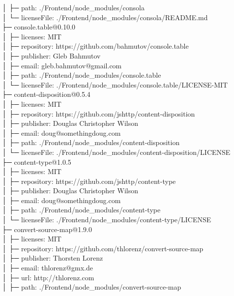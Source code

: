 \documentclass[
    paper=a4,
    twoside=false,
    parskip=half,
    listof=entryprefix,
    listof=totoc,
    index=totoc,
    bibliography=totoc,
    headsepline,
]{scrbook}
\begin{document}
    │  ├─ path: ./Frontend/node\_modules/consola\\
    │  └─ licenseFile: ./Frontend/node\_modules/consola/README.md\\
    ├─ console.table@0.10.0\\
    │  ├─ licenses: MIT\\
    │  ├─ repository: https://github.com/bahmutov/console.table\\
    │  ├─ publisher: Gleb Bahmutov\\
    │  ├─ email: gleb.bahmutov@gmail.com\\
    │  ├─ path: ./Frontend/node\_modules/console.table\\
    │  └─ licenseFile: ./Frontend/node\_modules/console.table/LICENSE-MIT\\
    ├─ content-disposition@0.5.4\\
    │  ├─ licenses: MIT\\
    │  ├─ repository: https://github.com/jshttp/content-disposition\\
    │  ├─ publisher: Douglas Christopher Wilson\\
    │  ├─ email: doug@somethingdoug.com\\
    │  ├─ path: ./Frontend/node\_modules/content-disposition\\
    │  └─ licenseFile: ./Frontend/node\_modules/content-disposition/LICENSE\\
    ├─ content-type@1.0.5\\
    │  ├─ licenses: MIT\\
    │  ├─ repository: https://github.com/jshttp/content-type\\
    │  ├─ publisher: Douglas Christopher Wilson\\
    │  ├─ email: doug@somethingdoug.com\\
    │  ├─ path: ./Frontend/node\_modules/content-type\\
    │  └─ licenseFile: ./Frontend/node\_modules/content-type/LICENSE\\
    ├─ convert-source-map@1.9.0\\
    │  ├─ licenses: MIT\\
    │  ├─ repository: https://github.com/thlorenz/convert-source-map\\
    │  ├─ publisher: Thorsten Lorenz\\
    │  ├─ email: thlorenz@gmx.de\\
    │  ├─ url: http://thlorenz.com\\
    │  ├─ path: ./Frontend/node\_modules/convert-source-map\\
\end{document}
